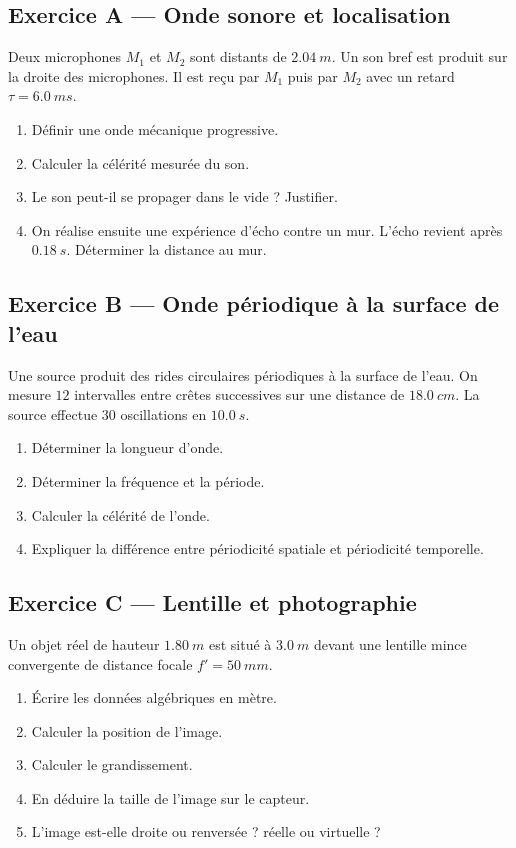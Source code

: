 \documentclass[11pt,a4paper]{article}
\begin{document}
\subsection*{Exercice A — Onde sonore et localisation}
Deux microphones $M_1$ et $M_2$ sont distants de $\SI{2.04}{m}$. Un son bref est produit sur la droite des microphones. Il est reçu par $M_1$ puis par $M_2$ avec un retard $\tau=\SI{6.0}{ms}$.
\begin{enumerate}[label=\arabic*)]
  \item Définir une onde mécanique progressive.
  \item Calculer la célérité mesurée du son.
  \item Le son peut-il se propager dans le vide ? Justifier.
  \item On réalise ensuite une expérience d'écho contre un mur. L'écho revient après $\SI{0.18}{s}$. Déterminer la distance au mur.
\end{enumerate}

\subsection*{Exercice B — Onde périodique à la surface de l'eau}
Une source produit des rides circulaires périodiques à la surface de l'eau. On mesure $12$ intervalles entre crêtes successives sur une distance de $\SI{18.0}{cm}$. La source effectue $30$ oscillations en $\SI{10.0}{s}$.
\begin{enumerate}[label=\arabic*)]
  \item Déterminer la longueur d'onde.
  \item Déterminer la fréquence et la période.
  \item Calculer la célérité de l'onde.
  \item Expliquer la différence entre périodicité spatiale et périodicité temporelle.
\end{enumerate}

\subsection*{Exercice C — Lentille et photographie}
Un objet réel de hauteur $\SI{1.80}{m}$ est situé à $\SI{3.0}{m}$ devant une lentille mince convergente de distance focale $f'=\SI{50}{mm}$.
\begin{enumerate}[label=\arabic*)]
  \item Écrire les données algébriques en mètre.
  \item Calculer la position de l'image.
  \item Calculer le grandissement.
  \item En déduire la taille de l'image sur le capteur.
  \item L'image est-elle droite ou renversée ? réelle ou virtuelle ?
\end{enumerate}
\end{document}
